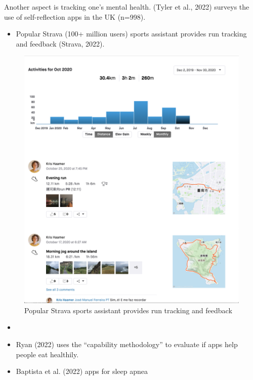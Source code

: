 \documentclass[
  letterpaper,
  DIV=11,
  numbers=noendperiod]{scrartcl}
\providecommand{\tightlist}{%
  \setlength{\itemsep}{0pt}\setlength{\parskip}{0pt}}\usepackage{longtable,booktabs,array}
\begin{document}
Another aspect is tracking one's mental health. (Tyler et al., 2022)
surveys the use of self-reflection apps in the UK (n=998).

\begin{itemize}
\tightlist
\item
  Popular Strava (100+ million users) sports assistant provides run
  tracking and feedback (Strava, 2022).
\end{itemize}

\begin{figure}[H]

{\centering \includegraphics[width=1\linewidth,height=\textheight,keepaspectratio]{./images/design/strava.png}

}

\caption{Popular Strava sports assistant provides run tracking and
feedback}

\end{figure}%

\begin{itemize}
\item
\item
  Ryan (2022) uses the ``capability methodology'' to evaluate if apps
  help people eat healthily.
\item
  Baptista et al. (2022) apps for sleep apnea
\end{itemize}
\end{document}
